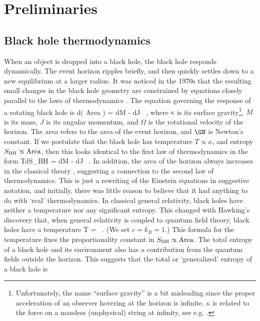 

\section{Preliminaries}

\subsection{Black hole thermodynamics}
When an object is dropped into a black hole, the black hole responds dynamically. The event horizon ripples briefly, and then quickly settles down to a new equilibrium at a larger radius. It was noticed in the 1970s that the resulting small changes in the black hole geometry are constrained by equations  closely parallel to the laws of thermodynamics \cite{Christodoulou:1970wf,Christodoulou:1972kt,Hawking:1971tu,Bekenstein:1972tm,Bekenstein:1973ur,carter1972rigidity,Bardeen:1973gs,Hawking:1974rv,Hawking:1974sw}. The equation governing the response of a rotating black hole is \cite{Bardeen:1973gs}
\be
\frac{\kappa}{8\pi \GN} d\left( \mbox{Area} \right)  = dM  - \Omega dJ \ ,
\ee
where $\kappa$ is its surface gravity\footnote{Unfortunately, the name ``surface gravity'' is a bit misleading since the proper acceleration of an observer hovering at the horizon is infinite. $\kappa$ is related to the force on a massless (unphysical) string at infinity, see e.g. \cite{Wald:1984rg}.}, $M$ is its mass, $J$ is its angular momentum, and $\Omega$ is the rotational velocity of the horizon. The area refers to the area of the event horizon, and $\GN$ is Newton's constant.
If we postulate that the black hole has temperature $T \propto \kappa$, and entropy $S_{\rm BH} \propto \mbox{Area}$, then this looks identical to the first law of thermodynamics in the form
\be\label{firstlaw}
TdS_{\rm BH} = dM - \Omega dJ \ .
\ee
In addition, the area of the horizon always increases in the classical theory \cite{Hawking:1971tu}, suggesting a connection to the second law of thermodynamics. 
This is just a rewriting of the Einstein equations in suggestive notation, and initially, there was little reason to believe that it had anything to do with `real' thermodynamics. In classical general relativity, black holes have neither a temperature nor any significant entropy.  This changed with Hawking's discovery that,  when general relativity is coupled to quantum field theory, black holes have a temperature \cite{Hawking:1974sw}
\be
T = \frac{\hbar \kappa}{2\pi } \ .
\ee
(We set $c=k_B = 1$.) This formula for the temperature fixes the proportionality constant in $S_{\rm BH} \propto \mbox{Area}$. The total entropy of a black hole and its environment also has a contribution from the quantum fields outside the horizon. This suggests that the total or `generalized' entropy of a black hole is \cite{Bekenstein:1973ur}
